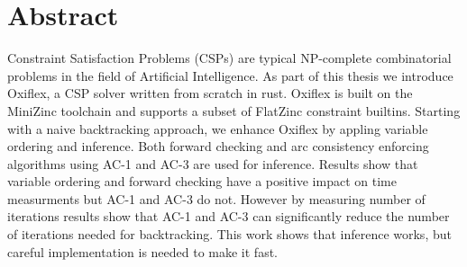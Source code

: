 
\chapter{Abstract}

Constraint Satisfaction Problems (CSPs) are typical NP-complete combinatorial problems in the field of Artificial Intelligence. As part of this thesis we introduce Oxiflex, a CSP solver written from scratch in rust. Oxiflex is built on the MiniZinc toolchain and supports a subset of FlatZinc constraint builtins. Starting with a naive backtracking approach, we enhance Oxiflex by appling variable ordering and inference. Both forward checking and arc consistency enforcing algorithms using AC-1 and AC-3 are used for inference. Results show that variable ordering and forward checking have a positive impact on time measurments but AC-1 and AC-3 do not. However by measuring number of iterations results show that AC-1 and AC-3 can significantly reduce the number of iterations needed for backtracking. This work shows that inference works, but careful implementation is needed to make it fast.


